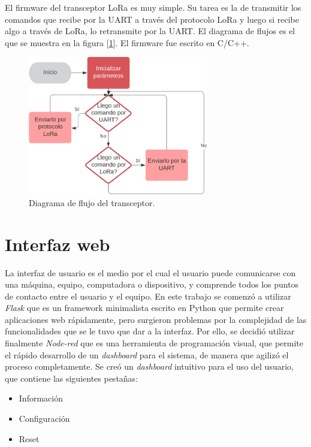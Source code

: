 El firmware del transceptor LoRa es muy simple. Su tarea es la de transmitir los comandos que recibe por la UART a través del protocolo LoRa y luego si recibe algo a través de LoRa, lo retransmite por la UART. El diagrama de flujos es el que se muestra en la figura [\ref{fig:diagramagateway}]. El firmware fue escrito en C/C++.

\begin{figure}[h!]
	\centering
	\includegraphics[width=0.7\textwidth]{./Figures/diagramagateway.png}
	\caption{Diagrama de flujo del transceptor.}
	\label{fig:diagramagateway}
\end{figure}


\section{Interfaz web}
\label{sec:interfaz}

La interfaz de usuario es el medio por el cual el usuario puede comunicarse con una máquina, equipo, computadora o dispositivo, y comprende todos los puntos de contacto entre el usuario y el equipo.
En este trabajo se comenzó a utilizar {\textit{Flask}} que es un framework minimalista escrito en Python que permite crear aplicaciones web rápidamente, pero surgieron problemas por la complejidad de las funcionalidades que se le tuvo que dar a la interfaz. Por ello, se decidió utilizar finalmente {\textit{Node-red}} que es una herramienta de programación visual, que permite el rápido desarrollo de un {\textit{dashboard}} para el sistema, de manera que agilizó el proceso completamente.
Se creó un {\textit{dashboard}} intuitivo para el uso del usuario, que contiene las siguientes pestañas:

\begin{itemize}
\item Información
\item Configuración
\item Reset
\end{itemize}

